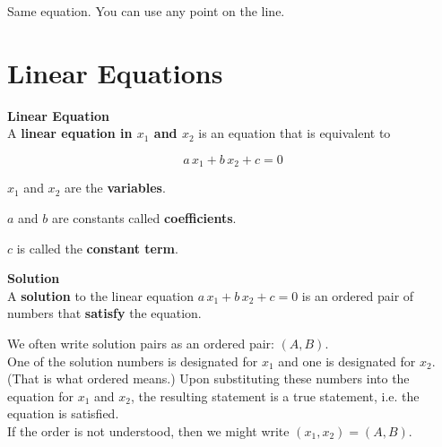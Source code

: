 \documentclass{ximera}
\begin{document}
Same equation.  You can use any point on the line.















\section{Linear Equations}


\begin{definition} \textbf{\textcolor{green!50!black}{Linear Equation}} \\


A \textbf{linear equation in $x_1$ and $x_2$} is an equation that is equivalent to 

\[
a \, x_1 + b \, x_2 + c = 0
\]


$x_1$ and $x_2$ are the \textbf{variables}.

$a$ and $b$ are constants called \textbf{coefficients}.

$c$ is called the \textbf{constant term}.

\end{definition}










\begin{definition} \textbf{\textcolor{green!50!black}{Solution}} \\


A \textbf{solution} to the linear equation  $a \, x_1 + b \, x_2 + c = 0$ is an ordered pair of numbers that \textbf{satisfy} the equation.


\end{definition}

\begin{notation}


We often write solution pairs as an ordered pair: $(A, B)$. \\


One of the solution numbers is designated for $x_1$ and one is designated for $x_2$.  (That is what ordered means.) Upon substituting these numbers into the equation for $x_1$ and $x_2$, the resulting statement is a true statement, i.e. the equation is satisfied. \\

If the order is not understood, then we might write $(x_1, x_2) = (A, B)$.


\end{notation}
\end{document}
